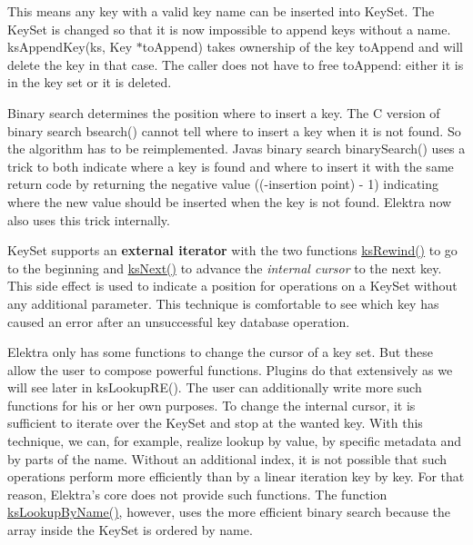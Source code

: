 This means any key with a valid key name can be inserted into {\ttfamily Key\+Set}. The {\ttfamily Key\+Set} is changed so that it is now impossible to append keys without a name. {\ttfamily ks\+Append\+Key(ks, Key $\ast$to\+Append)} takes ownership of the key {\ttfamily to\+Append} and will delete the key in that case. The caller does not have to free {\ttfamily to\+Append}\+: either it is in the key set or it is deleted.

Binary search determines the position where to insert a key. The C version of binary search {\ttfamily bsearch()} cannot tell where to insert a key when it is not found. So the algorithm has to be reimplemented. Java\textquotesingle{}s binary search {\ttfamily binary\+Search()} uses a trick to both indicate where a key is found and where to insert it with the same return code by returning the negative value {\ttfamily ((-\/insertion point) -\/ 1)} indicating where the new value should be inserted when the key is not found. Elektra now also uses this trick internally.

{\ttfamily Key\+Set} supports an {\bfseries{external iterator}} with the two functions {\ttfamily \mbox{\hyperlink{group__keyset_gabe793ff51f1728e3429c84a8a9086b70}{ks\+Rewind()}}} to go to the beginning and {\ttfamily \mbox{\hyperlink{group__keyset_ga317321c9065b5a4b3e33fe1c399bcec9}{ks\+Next()}}} to advance the {\itshape internal cursor} to the next key. This side effect is used to indicate a position for operations on a {\ttfamily Key\+Set} without any additional parameter. This technique is comfortable to see which key has caused an error after an unsuccessful key database operation.

Elektra only has some functions to change the cursor of a key set. But these allow the user to compose powerful functions. Plugins do that extensively as we will see later in {\ttfamily ks\+Lookup\+R\+E()}. The user can additionally write more such functions for his or her own purposes. To change the internal cursor, it is sufficient to iterate over the {\ttfamily Key\+Set} and stop at the wanted key. With this technique, we can, for example, realize lookup by value, by specific metadata and by parts of the name. Without an additional index, it is not possible that such operations perform more efficiently than by a linear iteration key by key. For that reason, Elektra’s core does not provide such functions. The function {\ttfamily \mbox{\hyperlink{group__keyset_gad2e30fb6d4739d917c5abb2ac2f9c1a1}{ks\+Lookup\+By\+Name()}}}, however, uses the more efficient binary search because the array inside the {\ttfamily Key\+Set} is ordered by name.

